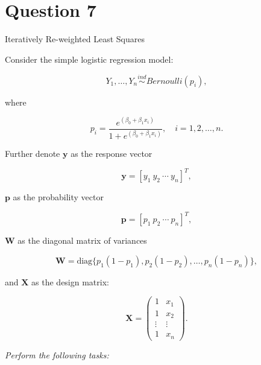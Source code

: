 \documentclass[letterpaper]{article}
\begin{document}
	\clearpage
	
	\section{Question 7}
	
	{\color{deepred} Iteratively Re-weighted Least Squares}
	
	Consider the simple logistic regression model:
	
	\[
	Y_1, \ldots, Y_n \overset{ind}{\sim} Bernoulli(p_i),
	\]
	
	where
	
	\[
	p_i = \frac{e^{(\beta_0 + \beta_1 x_i)}}{1 + e^{(\beta_0 + \beta_1 x_i)}}, \quad i = 1, 2, \ldots, n.
	\]
	
	Further denote $\mathbf{y}$ as the response vector
	
	\[
	\mathbf{y} = [y_1 \ y_2 \ \cdots \ y_n]^T,
	\]
	
	$\mathbf{p}$ as the probability vector
	
	\[
	\mathbf{p} = [p_1 \ p_2 \ \cdots \ p_n]^T,
	\]
	
	$\mathbf{W}$ as the diagonal matrix of variances
	
	\[
	\mathbf{W} = \text{diag}\{p_1(1-p_1), p_2(1-p_2), \ldots, p_n(1-p_n)\},
	\]
	
	and $\mathbf{X}$ as the design matrix:
	
	\[
	\mathbf{X} = \begin{pmatrix} 1 & x_1 \\ 1 & x_2 \\ \vdots & \vdots \\ 1 & x_n \end{pmatrix}.
	\]
	
	\textit{Perform the following tasks:}
	
\end{document}

